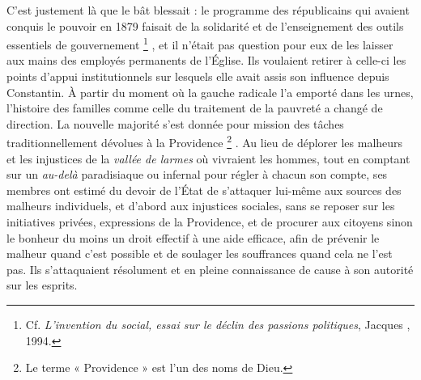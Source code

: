  C'est justement là que le bât blessait : le programme des républicains qui avaient conquis le pouvoir en 1879 faisait de la solidarité et de l'enseignement des outils essentiels de gouvernement%
\footnote{Cf. \emph{L'invention du social, essai sur le déclin des passions politiques}, Jacques , 1994.}%
, et il n'était pas question pour eux de les laisser aux mains des employés permanents de l'Église. Ils voulaient retirer à celle-ci les points d'appui institutionnels sur lesquels elle avait assis son influence depuis Constantin. À partir du moment où la gauche radicale l'a emporté dans les urnes, l'histoire des familles comme celle du traitement de la pauvreté a changé de direction. La nouvelle majorité s'est donnée pour mission des tâches traditionnellement dévolues à la Providence%
\footnote{Le terme « Providence » est l'un des noms de Dieu.}%
. Au lieu de déplorer les malheurs et les injustices de la \emph{vallée de larmes} où vivraient les hommes, tout en comptant sur un \emph{au-delà} paradisiaque ou infernal pour régler à chacun son compte, ses membres ont estimé du devoir de l'État de s'attaquer lui-même aux sources des malheurs individuels, et d'abord aux injustices sociales, sans se reposer sur les initiatives privées, expressions de la Providence, et de procurer aux citoyens sinon le bonheur du moins un droit effectif à une aide efficace, afin de prévenir le malheur quand c'est possible et de soulager les souffrances quand cela ne l'est pas. 
 Ils s'attaquaient résolument et en pleine connaissance de cause à son autorité sur les esprits.

